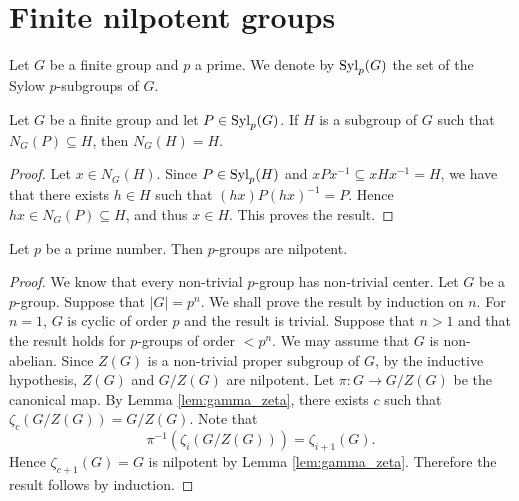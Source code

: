 \section{Finite nilpotent groups}

Let $G$ be a finite group and $p$ a prime. We denote by $\mathrm{Syl}_p(G)$ the set of the Sylow $p$-subgroups of $G$.

\begin{lemma}
	\label{lemma:N_G(H)=H}
	Let $G$ be a finite group and let $P\in\mathrm{Syl}_p(G)$. If $H$ is a subgroup of $G$
	such that $N_G(P)\subseteq H$, then $N_G(H)=H$.
\end{lemma}

\begin{proof}
	Let $x\in N_G(H)$. Since $P\in\mathrm{Syl}_p(H)$ and $xPx^{-1}\subseteq xHx^{-1}=H$, we have that there exists
	$h\in H$ such that $(hx)P(hx)^{-1}=P$. Hence $hx\in
	N_G(P)\subseteq H$, and thus $x\in H$. This proves the result. 
\end{proof}

%

\begin{lemma}\label{pgroup}
	Let $p$ be a prime number. Then $p$-groups are nilpotent.
\end{lemma}

\begin{proof}
    We know that every non-trivial $p$-group has non-trivial center. Let $G$ be a $p$-group. Suppose that $|G|=p^n$. We shall prove the result by induction on $n$. For $n=1$, $G$ is cyclic of order $p$ and the result is trivial. Suppose that $n>1$ and that the result holds for $p$-groups of order $<p^n$. We may assume that $G$ is non-abelian. Since $Z(G)$ is a non-trivial proper subgroup of $G$, by the inductive hypothesis, $Z(G)$ and $G/Z(G)$ are nilpotent. Let $\pi\colon G\rightarrow G/Z(G)$ be the canonical map. By Lemma \ref{lem:gamma_zeta}, there exists $c$ such that $\zeta_c(G/Z(G))=G/Z(G)$. Note that
    \[ \pi^{-1}(\zeta_i(G/Z(G)))=\zeta_{i+1}(G).\]
    Hence $\zeta_{c+1}(G)=G$ is nilpotent by Lemma \ref{lem:gamma_zeta}. Therefore the result follows by induction. 
\end{proof}

